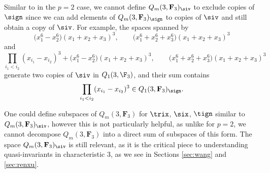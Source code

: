 \begin{Remark}
 Similar to in the $p=2$ case, we cannot define $Q_m(3,\mathbf{F}_3)_{\siv}$ to exclude copies of $\sign$ since we can add elements of $Q_m(3,\mathbf{F}_3)_{\sign}$ to copies of $\siv$ and still obtain a copy of $\siv$. For example, the spaces spanned by
 \[\big(x_1^6-x_2^6\big)(x_1+x_2+x_3)^3,\qquad\big(x_1^6+x_2^6+x_3^6\big)(x_1+x_2+x_3)^3\]
 and
 \[\prod_{i_1<i_2}(x_{i_1}-x_{i_2})^{3}+\big(x_1^6-x_2^6\big)(x_1+x_2+x_3)^3,\qquad\big(x_1^6+x_2^6+x_3^6\big)(x_1+x_2+x_3)^3\]
 generate two copies of $\siv$ in $Q_1(3,\F_3)$, and their sum contains
 \[\prod_{i_1<i_2}(x_{i_1}-x_{i_2})^{3}\in Q_1(3,\mathbf{F}_3)_{\sign}.\]
\end{Remark}

\begin{Remark}
 One could define subspaces of $Q_m(3,\mathbf{F}_3)$ for $\trix$, $\six$, $\tign$ similar to $Q_m(3,\mathbf{F}_3)_{\siv}$, however this is not particularly helpful, as unlike for ${p=2}$, we cannot decompose $Q_m(3,\mathbf{F}_3)$ into a direct sum of subspaces of this form. The space $Q_m(3,\mathbf{F}_3)_{\siv}$ is still relevant, as it is the critical piece to understanding quasi-invariants in characteristic 3, as we see in Sections \ref{sec:wang} and \ref{sec:renxu}.
\end{Remark}
